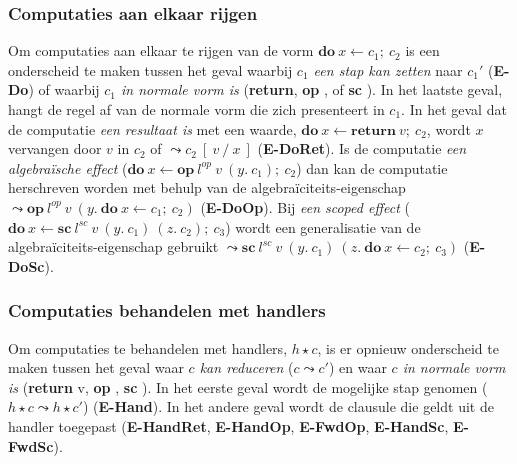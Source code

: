 \subsubsection{Computaties aan elkaar rijgen}
Om computaties aan elkaar te rijgen van de vorm $\textbf{do} \ x \leftarrow c_{1}; \ c_{2}$ is een onderscheid te maken tussen het geval waarbij \emph{$c_{1}$ een stap kan zetten} naar $c_{1}'$ (\textbf{E-Do}) of waarbij \emph{$c_{1}$ in normale vorm is} (\textbf{return}, \textbf{op \textellipsis}, of \textbf{sc \textellipsis}). \newline 
In het laatste geval, hangt de regel af van de normale vorm die zich presenteert in $c_{1}$. \newline 
In het geval dat de computatie \emph{een resultaat is} met een waarde, $\textbf{do} \ x \leftarrow \textbf{return} \ v ; \ c_{2}$, wordt $x$ vervangen door $v$ in $c_{2}$ of $\leadsto c_{2}\:[\:v\:/\:x\:]$ (\textbf{E-DoRet}). \newline
Is de computatie \emph{een algebraïsche effect} ($\textbf{do} \  x \leftarrow \textbf{op} \  l^{op} \  v \  (y. \  c_{1}); \  c_{2}$) dan kan de computatie herschreven worden met behulp van de algebraïciteits-eigenschap $\leadsto \textbf{op} \  l^{op} \  v \  (y. \   \textbf{do} \   x \leftarrow c_{1}; \  c_{2})$ (\textbf{E-DoOp}). \newline
Bij \emph{een scoped effect} ($\textbf{do} \ x \leftarrow \textbf{sc} \ l^{sc} \ v \ (y. \ c_{1}) \ (z. \ c_{2}); \ c_{3}$) wordt een generalisatie van de algebraïciteits-eigenschap gebruikt $\leadsto \textbf{sc} \ l^{sc} \ v \ (y. \ c_{1}) \ (z. \ \textbf{do} \ x \leftarrow c_{2}; \ c_{3})$ (\textbf{E-DoSc}).

\subsubsection{Computaties behandelen met handlers}
Om computaties te behandelen met handlers, $h \star c$, is er opnieuw onderscheid te maken tussen het geval waar \emph{$c$ kan reduceren} ($c \leadsto c'$) en waar \emph{$c$ in normale vorm is} (\textbf{return} v, \textbf{op \textellipsis}, \textbf{sc \textellipsis}). \newline 
In het eerste geval wordt de mogelijke stap genomen ($h \star c \leadsto h \star c'$) (\textbf{E-Hand}). In het andere geval wordt de clausule die geldt uit de handler toegepast (\textbf{E-HandRet}, \textbf{E-HandOp}, \textbf{E-FwdOp}, \textbf{E-HandSc}, \textbf{E-FwdSc}).

